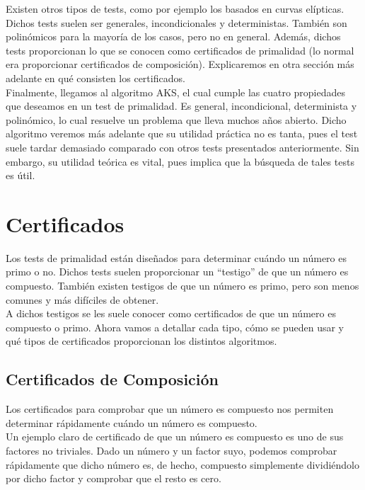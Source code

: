 Existen otros tipos de tests, como por ejemplo los basados en curvas elípticas. Dichos tests suelen ser generales, incondicionales y deterministas. También son polinómicos para la mayoría de los casos, pero no en general. Además, dichos tests proporcionan lo que se conocen como certificados de primalidad (lo normal era proporcionar certificados de composición). Explicaremos en otra sección más adelante en qué consisten los certificados.\\

Finalmente, llegamos al algoritmo AKS, el cual cumple las cuatro propiedades que deseamos en un test de primalidad. Es general, incondicional, determinista y polinómico, lo cual resuelve un problema que lleva muchos años abierto. Dicho algoritmo veremos más adelante que su utilidad práctica no es tanta, pues el test suele tardar demasiado comparado con otros tests presentados anteriormente. Sin embargo, su utilidad teórica es vital, pues implica que la búsqueda de tales tests es útil.

\section{Certificados}

Los tests de primalidad están diseñados para determinar cuándo un número es primo o no. Dichos tests suelen proporcionar un ``testigo'' de que un número es compuesto. También existen testigos de que un número es primo, pero son menos comunes y más difíciles de obtener.\\

A dichos testigos se les suele conocer como certificados de que un número es compuesto o primo. Ahora vamos a detallar cada tipo, cómo se pueden usar y qué tipos de certificados proporcionan los distintos algoritmos.

\subsection{Certificados de Composición}

Los certificados para comprobar que un número es compuesto nos permiten determinar rápidamente cuándo un número es compuesto.\\

Un ejemplo claro de certificado de que un número es compuesto es uno de sus factores no triviales. Dado un número y un factor suyo, podemos comprobar rápidamente que dicho número es, de hecho, compuesto simplemente dividiéndolo por dicho factor y comprobar que el resto es cero.\\

